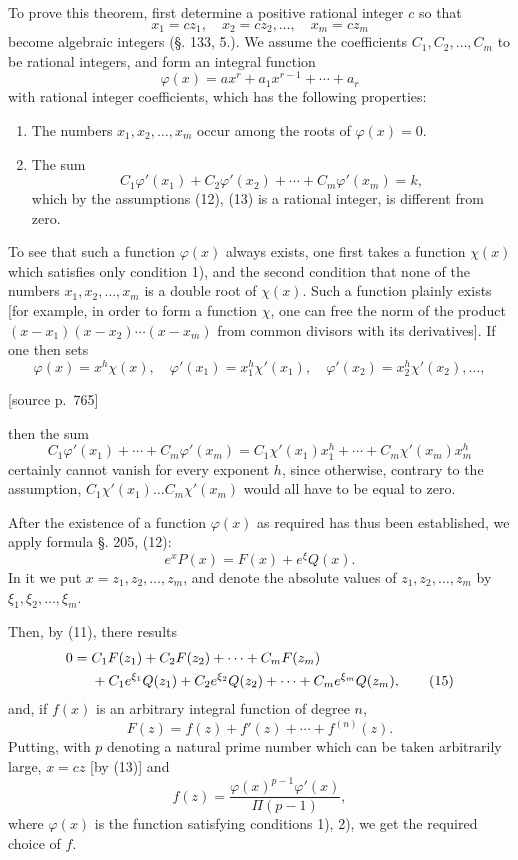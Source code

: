 \documentclass[11pt]{article}
\newcommand{\srcpage}[1]{\par\medskip\noindent\textsf{[source p.~#1]}\par\smallskip}
\begin{document}
To prove this theorem, first determine a positive rational integer $c$ so that
\begin{equation}\tag{13}
x_1=cz_1,\quad x_2=cz_2,\ldots,\quad x_m=cz_m
\end{equation}
become algebraic integers (§. 133, 5.). We assume the coefficients $C_1,C_2,\ldots,C_m$ to be rational integers, and form an integral function
\begin{equation}\tag{14}
\varphi(x)=ax^r+a_1x^{r-1}+\cdots+a_r
\end{equation}
with rational integer coefficients, which has the following properties:
\begin{enumerate}[label=\arabic*)]
\item The numbers $x_1,x_2,\ldots,x_m$ occur among the roots of $\varphi(x)=0$.
\item The sum
\[
C_1\varphi'(x_1)+C_2\varphi'(x_2)+\cdots+C_m\varphi'(x_m)=k,
\]
which by the assumptions (12), (13) is a rational integer, is different from zero.
\end{enumerate}

To see that such a function $\varphi(x)$ always exists, one first takes a function $\chi(x)$ which satisfies only condition 1), and the second condition that none of the numbers $x_1,x_2,\ldots,x_m$ is a double root of $\chi(x)$. Such a function plainly exists [for example, in order to form a function $\chi$, one can free the norm of the product $(x-x_1)(x-x_2)\cdots(x-x_m)$ from common divisors with its derivatives]. If one then sets
\[
\varphi(x)=x^h\chi(x),\quad
\varphi'(x_1)=x_1^h\chi'(x_1),\quad
\varphi'(x_2)=x_2^h\chi'(x_2),\ldots,
\]
\srcpage{765}
then the sum
\[
C_1\varphi'(x_1)+\cdots+C_m\varphi'(x_m)
=
C_1\chi'(x_1)x_1^h+\cdots+C_m\chi'(x_m)x_m^h
\]
certainly cannot vanish for every exponent $h$, since otherwise, contrary to the assumption, $C_1\chi'(x_1)\ldots C_m\chi'(x_m)$ would all have to be equal to zero.

After the existence of a function $\varphi(x)$ as required has thus been established, we apply formula §. 205, (12):
\[
e^xP(x)=F(x)+e^\xi Q(x).
\]
In it we put $x=z_1,z_2,\ldots,z_m$, and denote the absolute values of $z_1,z_2,\ldots,z_m$ by $\xi_1,\xi_2,\ldots,\xi_m$.

Then, by (11), there results
\begin{align}
0={}&C_1F(z_1)+C_2F(z_2)+\cdots+C_mF(z_m)\notag\\
&+C_1e^{\xi_1}Q(z_1)+C_2e^{\xi_2}Q(z_2)+\cdots+C_me^{\xi_m}Q(z_m),
\tag{15}
\end{align}
and, if $f(x)$ is an arbitrary integral function of degree $n$,
\begin{equation}\tag{16}
F(z)=f(z)+f'(z)+\cdots+f^{(n)}(z).
\end{equation}
Putting, with $p$ denoting a natural prime number which can be taken arbitrarily large, $x=cz$ [by (13)] and
\begin{equation}\tag{17}
f(z)=\frac{\varphi(x)^{p-1}\varphi'(x)}{\Pi(p-1)},
\end{equation}
where $\varphi(x)$ is the function satisfying conditions 1), 2), we get the required choice of $f$.
\end{document}
